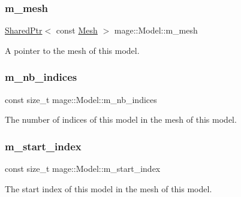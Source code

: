 \subsubsection{\texorpdfstring{m\+\_\+mesh}{m\_mesh}}
{\footnotesize\ttfamily \hyperlink{namespacemage_a1e01ae66713838a7a67d30e44c67703e}{Shared\+Ptr}$<$ const \hyperlink{classmage_1_1_mesh}{Mesh} $>$ mage\+::\+Model\+::m\+\_\+mesh\hspace{0.3cm}{\ttfamily [private]}}

A pointer to the mesh of this model. \hypertarget{classmage_1_1_model_a1fcf80ed9f3002bd2319ef83f073ae75}{}\label{classmage_1_1_model_a1fcf80ed9f3002bd2319ef83f073ae75} 
\subsubsection{\texorpdfstring{m\+\_\+nb\+\_\+indices}{m\_nb\_indices}}
{\footnotesize\ttfamily const size\+\_\+t mage\+::\+Model\+::m\+\_\+nb\+\_\+indices\hspace{0.3cm}{\ttfamily [private]}}

The number of indices of this model in the mesh of this model. \hypertarget{classmage_1_1_model_a63a3e697c9eb1606249de15cc7b818c3}{}\label{classmage_1_1_model_a63a3e697c9eb1606249de15cc7b818c3} 
\subsubsection{\texorpdfstring{m\+\_\+start\+\_\+index}{m\_start\_index}}
{\footnotesize\ttfamily const size\+\_\+t mage\+::\+Model\+::m\+\_\+start\+\_\+index\hspace{0.3cm}{\ttfamily [private]}}

The start index of this model in the mesh of this model. 